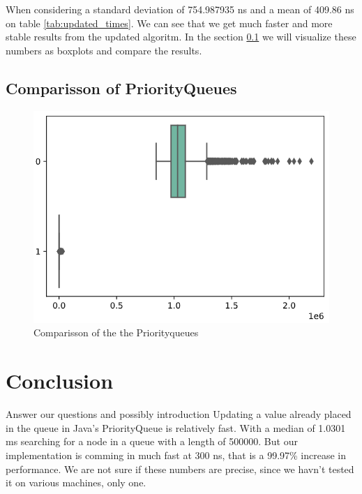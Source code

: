 \documentclass{article}
\begin{document}
When considering a standard deviation of 754.987935 ns and a mean of 409.86 ns on table \ref{tab:updated_times}.
We can see that we get much faster and more stable results from the updated algoritm. In the section
\ref{sec:comparisson_of_priorityqueues} we will
visualize these numbers as boxplots and compare the results.


\subsection{Comparisson of PriorityQueues} %
\label{sec:comparisson_of_priorityqueues}
\begin{figure}[h]
\label{img:boxplot_comparisson}
\includegraphics[width=\textwidth]{boxplot_comparisson}
\caption{Comparisson of the the Priorityqueues}
\end{figure}


\section{Conclusion} %
Answer our questions and possibly introduction
Updating a value already placed in the queue in Java's PriorityQueue is relatively
fast. With a median of 1.0301 ms searching for a node in a queue with a length of 
500000. But our implementation is comming in much fast at 300 ns, that is a 99.97\% 
increase in performance. We are not sure if these numbers are precise, since we havn't 
tested it on various machines, only one. 




\end{document}
